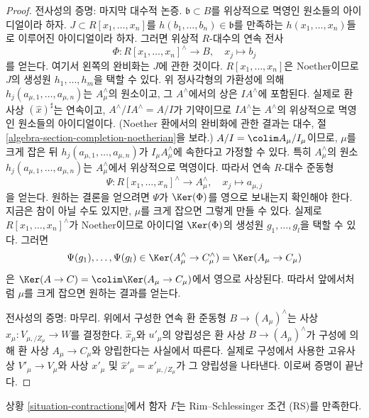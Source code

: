 \begin{proof}
\medskip\noindent
전사성의 증명: 마지막 대수적 논증.
$\mathfrak b \subset B$를 위상적으로 멱영인 원소들의 아이디얼이라 하자.
$J \subset R[x_1, \ldots, x_n]$를
$h(b_1, \ldots, b_n) \in \mathfrak b$를 만족하는
$h(x_1, \ldots, x_n)$들로 이루어진 아이디얼이라 하자.
그러면 위상적 $R$-대수의 연속 전사
$$
\Phi : R[x_1, \ldots, x_n]^\wedge \longrightarrow B,\quad
x_j \longmapsto b_j
$$
를 얻는다. 여기서 왼쪽의 완비화는 $J$에 관한 것이다.
$R[x_1, \ldots, x_n]$은 Noether이므로 $J$의 생성원
$h_1, \ldots, h_m$을 택할 수 있다. 위 정사각형의 가환성에 의해
$h_j(a_{\mu, 1}, \ldots, a_{\mu, n})$는 $A_\mu^\wedge$의 원소이고,
그 $A^\wedge$에서의 상은 $IA^\wedge$에 포함된다.
실제로 환 사상 $(\hat x)^\sharp$는 연속이고,
$A^\wedge/IA^\wedge = A/I$가 기약이므로 $IA^\wedge$는
$A^\wedge$의 위상적으로 멱영인 원소들의 아이디얼이다.
(Noether 환에서의 완비화에 관한 결과는 대수, 절
\ref{algebra-section-completion-noetherian}을 보라.)
$A/I = \colim A_\mu/I_\mu$이므로, $\mu$를 크게 잡은 뒤
$h_j(a_{\mu, 1}, \ldots, a_{\mu, n})$가
$I_\mu A_\mu^\wedge$에 속한다고 가정할 수 있다.
특히 $A_\mu^\wedge$의 원소
$h_j(a_{\mu, 1}, \ldots, a_{\mu, n})$는
$A_\mu^\wedge$에서 위상적으로 멱영이다.
따라서 연속 $R$-대수 준동형
$$
\Psi : R[x_1, \ldots, x_n]^\wedge \longrightarrow A_\mu^\wedge,\quad
x_j \longmapsto a_{\mu, j}
$$
을 얻는다. 원하는 결론을 얻으려면 $\Psi$가 $\Ker(\Phi)$를
영으로 보내는지 확인해야 한다. 지금은 참이 아닐 수도 있지만,
$\mu$를 크게 잡으면 그렇게 만들 수 있다. 실제로
$R[x_1, \ldots, x_n]^\wedge$가 Noether이므로 아이디얼
$\Ker(\Phi)$의 생성원 $g_1, \ldots, g_l$을 택할 수 있다.
그러면
$$
\Psi(g_1), \ldots, \Psi(g_l) \in
\Ker(A_\mu^\wedge \to C_\mu^\wedge) = \Ker(A_\mu \to C_\mu)
$$
은 $\Ker(A \to C) = \colim \Ker(A_\mu \to C_\mu)$에서
영으로 사상된다. 따라서 앞에서처럼 $\mu$를 크게 잡으면 원하는 결과를 얻는다.

\medskip\noindent
전사성의 증명: 마무리. 위에서 구성한 연속 환 준동형
$B \to (A_\mu)^\wedge$는 사상
$\hat x_\mu : V_{\mu, /Z_\mu} \to W$를 결정한다.
$\hat x_\mu$와 $u'_\mu$의 양립성은 환 사상
$B \to (A_\mu)^\wedge$가 구성에 의해 환 사상
$A_\mu \to C_\mu$와 양립한다는 사실에서 따른다.
실제로 구성에서 사용한 고유사상 $V'_\mu \to V_\mu$와
사상 $x'_\mu$ 및 $\hat x'_\mu = x'_{\mu, /Z_\mu}$가
그 양립성을 나타낸다. 이로써 증명이 끝난다.
\end{proof}

\begin{lemma}
\label{lemma-rs}
상황 \ref{situation-contractions}에서 함자 $F$는
Rim--Schlessinger 조건 (RS)를 만족한다.
\end{lemma}

